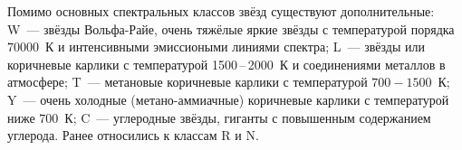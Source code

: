 Помимо основных спектральных классов звёзд существуют дополнительные: W~--- звёзды Вольфа-Райе, очень тяжёлые яркие звёзды с температурой порядка $70000$~К и интенсивными эмиссиоными линиями спектра; L~--- звёзды или коричневые карлики с температурой 1500\,--\,2000~К и соединениями металлов в атмосфере; T~--- метановые коричневые карлики с температурой $700 - 1500$~К; Y~---  очень холодные (метано-аммиачные) коричневые карлики с температурой ниже $700$~К; C~--- углеродные звёзды, гиганты с повышенным содержанием углерода. Ранее относились к классам R и N.